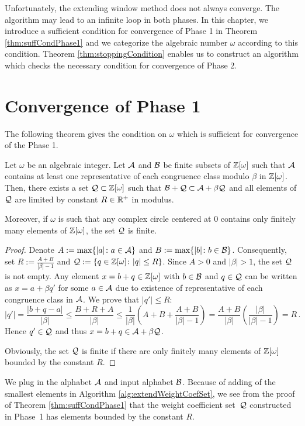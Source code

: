 Unfortunately, the extending window method does not always converge. The algorithm may lead to an infinite loop in both phases. 
In this chapter, we introduce a sufficient condition for convergence of Phase 1 in Theorem \ref{thm:suffCondPhase1} and we categorize the algebraic number $\omega$ according to this condition. Theorem \ref{thm:stoppingCondition} enables us to construct an algorithm which checks the necessary condition for convergence of Phase 2.


\section{Convergence of Phase 1}
\label{sec:convergencePhase1}
The following theorem gives the condition on $\omega$ which is sufficient for convergence of the Phase 1.
\begin{theo}
\label{thm:suffCondPhase1}
    Let $\omega$ be an algebraic integer. Let $\mathcal{A}$ and $\mathcal{B}$ be finite subsets of $\mathbb{Z}[\omega]$ such that $\mathcal{A}$ contains at least one representative of each congruence class modulo $\beta$ in $\mathbb{Z}[\omega]$. Then, there exists a set $\mathcal{Q}\subset\mathbb{Z}[\omega]$ such that $ \mathcal{B} + \mathcal{Q} \subset \mathcal{A} + \beta \mathcal{Q}$ and all elements of $\mathcal{Q}$ are limited by constant $R\in \mathbb{R}^+$ in modulus.
    
    Moreover, if $\omega$ is such that any complex circle centered at 0 contains only finitely  many elements of $\mathbb{Z}[\omega]$, the set $\mathcal{Q}$ is finite. 
\end{theo}
\begin{proof}
 Denote $A:=\max\{|a|\colon a \in \mathcal{A}\}$ and $B:=\max\{|b|\colon b\in\mathcal{B}\}$. Consequently, set $R:=\frac{A+B}{|\beta|-1}$ and $\mathcal{Q}:=\{q\in\mathbb{Z}[\omega]\colon |q|\leq R\}$. Since $A>0$ and $|\beta|>1$, the set $\mathcal{Q}$ is not empty. Any element $x=b+q \in \mathbb{Z}[\omega]$ with $b\in\mathcal{B}$ and $q\in\mathcal{Q}$ can be written as $x=a+\beta q'$ for some $a\in\mathcal{A}$ due to existence of representative of each congruence class in $\mathcal{A}$. We prove that $|q'|\leq R$:
 $$
    |q'|=\frac{|b+q-a|}{|\beta|}\leq \frac{B+R+A}{|\beta|} \leq \frac{1}{|\beta|}\left(A+B+\frac{A+B}{|\beta|-1}\right)  =\frac{A+B}{|\beta|}\left(\frac{|\beta|}{|\beta|-1}\right)=R\,.
 $$ 
 Hence $q'\in\mathcal{Q}$ and thus  $x=b+q \in \mathcal{A} + \beta \mathcal{Q}$. 
 
 Obviously, the set $\mathcal{Q}$ is finite if there are only finitely many elements of $\mathbb{Z}[\omega]$ bounded by the constant $R$.
\end{proof}
We plug in the alphabet $\mathcal{A}$ and input alphabet $\mathcal{B}$. Because of adding of the smallest elements in Algorithm \ref{alg:extendWeightCoefSet}, we see from the proof of Theorem \ref{thm:suffCondPhase1} that the weight coefficient set~$\mathcal{Q}$ constructed in Phase~1 has elements bounded by the constant $R$. 

